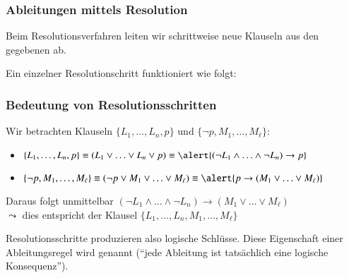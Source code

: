 \documentclass[aspectratio=1610,onlymath]{beamer}
\begin{document}
\begin{frame}\frametitle{Ableitungen mittels Resolution}

Beim Resolutionsverfahren leiten wir schrittweise neue Klauseln aus den gegebenen ab.
\bigskip

Ein einzelner Resolutionschritt funktioniert wie folgt:

\pause


\end{frame}

\begin{frame}\frametitle{Bedeutung von Resolutionsschritten}

Wir betrachten Klauseln $\{L_1,\ldots,L_n,p\}$ und $\{\neg p,M_1,\ldots,M_\ell\}$:\pause
\begin{itemize}
\item $\{L_1,\ldots,L_n,p\}\equiv (L_1\vee\ldots\vee L_n\vee p) \equiv \alert{(\neg L_1\wedge\ldots\wedge\neg L_n)\to p}$\pause
\item $\{\neg p,M_1,\ldots,M_\ell\}\equiv (\neg p\vee M_1\vee\ldots\vee M_\ell)\equiv \alert{p\to (M_1\vee\ldots\vee M_\ell)}$\pause
\end{itemize}\medskip

Daraus folgt unmittelbar \alert{$(\neg L_1\wedge\ldots\wedge\neg L_n)\to (M_1\vee\ldots\vee M_\ell)$}\\
$\leadsto$ dies entspricht der Klausel $\{L_1,\ldots,L_n,M_1,\ldots,M_\ell\}$\pause
\bigskip


Resolutionsschritte produzieren also logische Schlüsse. Diese Eigenschaft einer Ableitungsregel wird  genannt ("`jede Ableitung ist tatsächlich eine logische Konsequenz"').


\end{frame}
\end{document}
